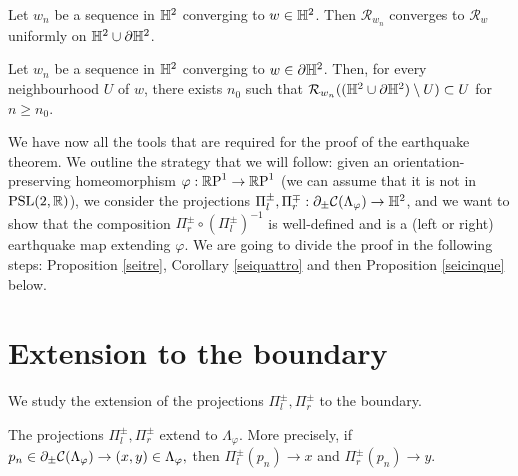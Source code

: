 \begin{lemma}\label{67}
    Let $w_n$ be a sequence in $\H^2$ converging to $w\in \H^2$. Then $\mathcal{R}_{w_n}$ converges to $\mathcal{R}_w$
uniformly on $\H^2\cup\partial\H^2$.
\end{lemma}

\begin{lemma}\label{68}
    Let $w_n$ be a sequence in $\H^2$ converging to $w\in \partial\H^2$. Then, for every neighbourhood $U$ of $w$, there exists $n_0$ such that $\mathcal{R}_{w_n}((\H^2\cup \partial\H^2)\setminus U)\subset U$ for $n\geq n_0.$
\end{lemma}

We have now all the tools that are required for the proof of the earthquake theorem. We outline the strategy that we will follow: given an orientation-preserving homeomorphism $\varphi:\S\to\S$ (we can assume that it is not in $\PSL$), we consider the projections $\Pi_l^\pm,\Pi_r^\mp:\partial_\pm\CF\to\H^2$, and we want to show that the composition $\Pi_r^\pm\circ(\Pi_l^\pm)^{-1}$  is well-defined and is a (left or right) earthquake map extending $\varphi$. We are going to divide the proof in the following steps: Proposition \ref{seitre}, Corollary \ref{seiquattro} and then Proposition \ref{seicinque} below.

\section{Extension to the boundary}
We study the extension of the projections $\Pi_l^\pm, \Pi_r^\pm$ to the boundary.
\begin{proposition}\label{seiuno}
    The projections $\Pi_l^\pm, \Pi_r^\pm$ extend to $\Lambda_\varphi$. More precisely, if $p_n\in\partial_\pm\CF\to(x,y)\in\Lambda_\varphi,$ then $\Pi_l^\pm(p_n)\to x$ and $\Pi_r^\pm(p_n)\to y$.
\end{proposition}

